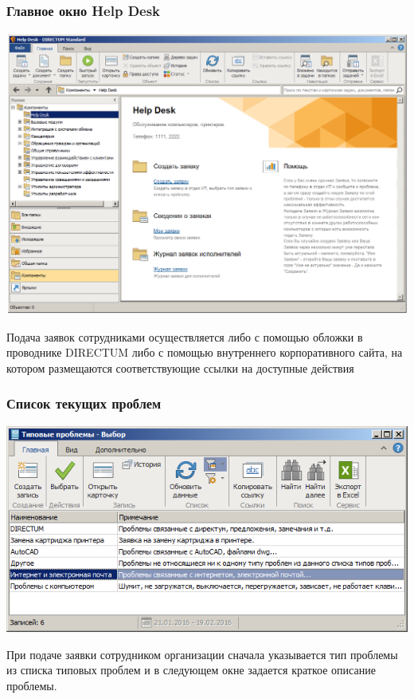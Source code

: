 \documentclass{../industrial-development}
\begin{document}
\begin{frame} \frametitle{Главное окно Help Desk}
\centerline{\includegraphics[width=\textwidth]{pic1.png}}
\end{frame}
\lecturenotes
Подача заявок сотрудниками осуществляется либо с помощью обложки в проводнике DIRECTUM либо с помощью внутреннего корпоративного сайта, на котором размещаются соответствующие ссылки на доступные действия

\begin{frame} \frametitle{Список текущих проблем}
\centerline{\includegraphics[width=\textwidth]{pic2.png}}
\end{frame}
\lecturenotes
При подаче заявки сотрудником организации сначала указывается тип проблемы из списка типовых проблем и в следующем окне задается краткое описание проблемы. 
\end{document}
